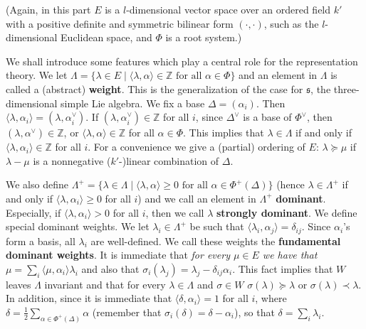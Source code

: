 \documentclass{article}
\newcommand{\InZ}{\mathbb{Z}}
\newcommand{\SBar}{\;|\;}
\newcommand{\lie}[1]{\mathfrak{#1}}
\begin{document}
(Again, in this part $E$ is a $l$-dimensional vector space over an ordered field $k'$ with a positive definite and symmetric bilinear form $(\cdot, \cdot)$, such as the $l$-dimensional Euclidean space, and $\Phi$ is a root system.)

We shall introduce some features which play a central role for the representation theory.
We let $\Lambda = \{\lambda \in E \SBar \langle \lambda, \alpha \rangle \in \InZ \textrm{ for all $\alpha \in \Phi$}\}$ and an element in $\Lambda$ is called a (abstract) \textbf{weight}.
This is the generalization of the case for $\lie{s}$, the three-dimensional simple Lie algebra.
We fix a base $\Delta = (\alpha_i)$.
Then $\langle \lambda, \alpha_i \rangle = (\lambda, \alpha_i^\vee)$.
If $(\lambda, \alpha_i^\vee) \in \InZ$ for all $i$, since $\Delta^\vee$ is a base of $\Phi^\vee$, then $(\lambda, \alpha^\vee) \in \InZ$, or $\langle \lambda, \alpha \rangle \in \InZ$ for all $\alpha \in \Phi$.
This implies that $\lambda \in \Lambda$ if and only if $\langle \lambda, \alpha_i \rangle \in \InZ$ for all $i$.
For a convenience we give a (partial) ordering of $E$: $\lambda \succeq \mu$ if $\lambda - \mu$ is a nonnegative ($k'$-)linear combination of $\Delta$.

We also define $\Lambda^+ = \{\lambda \in \Lambda \SBar \langle \lambda, \alpha \rangle \ge 0 \textrm{ for all $\alpha \in \Phi^+(\Delta)$}\}$ (hence $\lambda \in \Lambda^+$ if and only if $\langle \lambda, \alpha_i \rangle \ge 0$ for all $i$) and we call an element in $\Lambda^+$ \textbf{dominant}.
Especially, if $\langle \lambda, \alpha_i \rangle > 0$ for all $i$, then we call $\lambda$ \textbf{strongly dominant}.
We define special dominant weights.
We let $\lambda_i \in \Lambda^+$ be such that $\langle \lambda_i, \alpha_j \rangle = \delta_{ij}$.
Since $\alpha_i$'s form a basis, all $\lambda_i$ are well-defined.
We call these weights the \textbf{fundamental dominant weights}.
It is immediate that \textit{for every $\mu \in E$ we have that $\mu = \sum_i \langle \mu, \alpha_i \rangle \lambda_i$} and also that $\sigma_i(\lambda_j) = \lambda_j - \delta_{ij} \alpha_i$.
This fact implies that $W$ leaves $\Lambda$ invariant and that for every $\lambda \in \Lambda$ and $\sigma \in W$ $\sigma(\lambda) \succeq \lambda$ or $\sigma(\lambda) \prec \lambda$.
In addition, since it is immediate that $\langle \delta, \alpha_i \rangle = 1$ for all $i$, where $\delta = \frac{1}{2} \sum_{\alpha \in \Phi^+(\Delta)} \alpha$ (remember that $\sigma_i(\delta) = \delta - \alpha_i$), so that $\delta = \sum_i \lambda_i$.
\end{document}
